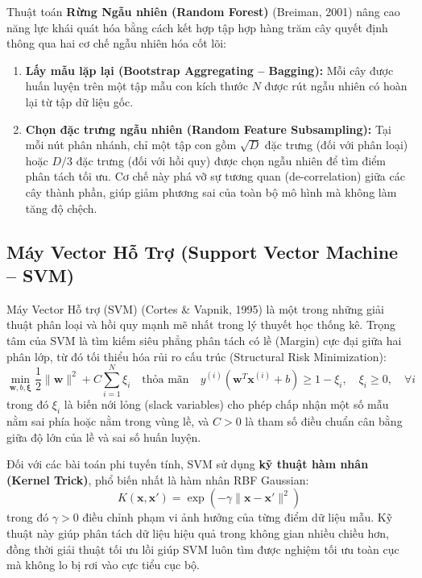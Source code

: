 \documentclass[12pt,a4paper]{report}
\begin{document}
Thuật toán \textbf{Rừng Ngẫu nhiên (Random Forest)} (Breiman, 2001) nâng cao năng lực khái quát hóa bằng cách kết hợp tập hợp hàng trăm cây quyết định thông qua hai cơ chế ngẫu nhiên hóa cốt lõi:
\begin{enumerate}[leftmargin=1.2cm]
    \item \textbf{Lấy mẫu lặp lại (Bootstrap Aggregating -- Bagging):} Mỗi cây được huấn luyện trên một tập mẫu con kích thước $N$ được rút ngẫu nhiên có hoàn lại từ tập dữ liệu gốc.
    \item \textbf{Chọn đặc trưng ngẫu nhiên (Random Feature Subsampling):} Tại mỗi nút phân nhánh, chỉ một tập con gồm $\sqrt{D}$ đặc trưng (đối với phân loại) hoặc $D/3$ đặc trưng (đối với hồi quy) được chọn ngẫu nhiên để tìm điểm phân tách tối ưu. Cơ chế này phá vỡ sự tương quan (de-correlation) giữa các cây thành phần, giúp giảm phương sai của toàn bộ mô hình mà không làm tăng độ chệch.
\end{enumerate}

\subsection{Máy Vector Hỗ Trợ (Support Vector Machine -- SVM)}
Máy Vector Hỗ trợ (SVM) (Cortes \& Vapnik, 1995) là một trong những giải thuật phân loại và hồi quy mạnh mẽ nhất trong lý thuyết học thống kê. Trọng tâm của SVM là tìm kiếm siêu phẳng phân tách có lề (Margin) cực đại giữa hai phân lớp, từ đó tối thiểu hóa rủi ro cấu trúc (Structural Risk Minimization):
\begin{equation}
\min_{\mathbf{w}, b, \boldsymbol{\xi}} \frac{1}{2} \|\mathbf{w}\|^2 + C \sum_{i=1}^N \xi_i \quad \text{thỏa mãn} \quad y^{(i)}(\mathbf{w}^T \mathbf{x}^{(i)} + b) \ge 1 - \xi_i, \quad \xi_i \ge 0, \quad \forall i
\end{equation}
trong đó $\xi_i$ là biến nới lỏng (slack variables) cho phép chấp nhận một số mẫu nằm sai phía hoặc nằm trong vùng lề, và $C > 0$ là tham số điều chuẩn cân bằng giữa độ lớn của lề và sai số huấn luyện.

Đối với các bài toán phi tuyến tính, SVM sử dụng \textbf{kỹ thuật hàm nhân (Kernel Trick)}, phổ biến nhất là hàm nhân RBF Gaussian:
\begin{equation}
K(\mathbf{x}, \mathbf{x}') = \exp\left( -\gamma \|\mathbf{x} - \mathbf{x}'\|^2 \right)
\end{equation}
trong đó $\gamma > 0$ điều chỉnh phạm vi ảnh hưởng của từng điểm dữ liệu mẫu. Kỹ thuật này giúp phân tách dữ liệu hiệu quả trong không gian nhiều chiều hơn, đồng thời giải thuật tối ưu lồi giúp SVM luôn tìm được nghiệm tối ưu toàn cục mà không lo bị rơi vào cực tiểu cục bộ.
\end{document}
